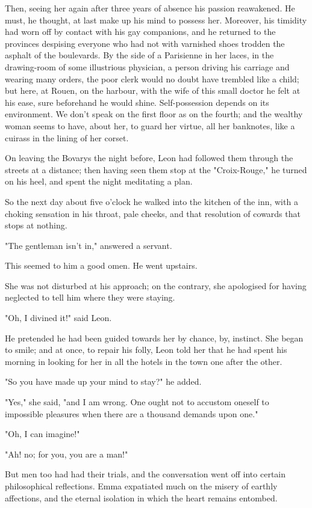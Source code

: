 \documentclass[11pt,twocolumn]{ltugboat}
\begin{document}
Then, seeing her again after three years of absence his passion
reawakened. He must, he thought, at last make up his mind to possess
her. Moreover, his timidity had worn off by contact with his gay
companions, and he returned to the provinces despising everyone who had
not with varnished shoes trodden the asphalt of the boulevards. By
the side of a Parisienne in her laces, in the drawing-room of some
illustrious physician, a person driving his carriage and wearing many
orders, the poor clerk would no doubt have trembled like a child; but
here, at Rouen, on the harbour, with the wife of this small doctor
he felt at his ease, sure beforehand he would shine. Self-possession
depends on its environment. We don't speak on the first floor as on the
fourth; and the wealthy woman seems to have, about her, to guard her
virtue, all her banknotes, like a cuirass in the lining of her corset.

On leaving the Bovarys the night before, Leon had followed them
through the streets at a distance; then having seen them stop at the
"Croix-Rouge," he turned on his heel, and spent the night meditating a
plan.

So the next day about five o'clock he walked into the kitchen of the
inn, with a choking sensation in his throat, pale cheeks, and that
resolution of cowards that stops at nothing.

"The gentleman isn't in," answered a servant.

This seemed to him a good omen. He went upstairs.

She was not disturbed at his approach; on the contrary, she apologised
for having neglected to tell him where they were staying.

"Oh, I divined it!" said Leon.

He pretended he had been guided towards her by chance, by, instinct. She
began to smile; and at once, to repair his folly, Leon told her that he
had spent his morning in looking for her in all the hotels in the town
one after the other.

"So you have made up your mind to stay?" he added.

"Yes," she said, "and I am wrong. One ought not to accustom oneself to
impossible pleasures when there are a thousand demands upon one."

"Oh, I can imagine!"

"Ah! no; for you, you are a man!"

But men too had had their trials, and the conversation went off into
certain philosophical reflections. Emma expatiated much on the misery of
earthly affections, and the eternal isolation in which the heart remains
entombed.
\end{document}
